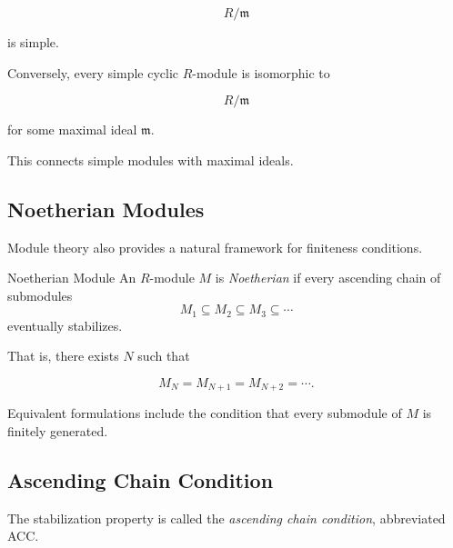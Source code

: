 \[ R/\mathfrak m \]

is simple.

Conversely, every simple cyclic \(R\)-module is isomorphic to

\[ R/\mathfrak m \]

for some maximal ideal \(\mathfrak m\).

This connects simple modules with maximal ideals.

\subsection{Noetherian Modules}
\label{subsec:noetherian-modules}

Module theory also provides a natural framework for finiteness conditions.

\begin{definitionbox}{Noetherian Module}
An \(R\)-module \(M\) is \emph{Noetherian} if every ascending chain of
submodules
\[ M_1\subseteq M_2\subseteq M_3\subseteq\cdots \]
eventually stabilizes.
\end{definitionbox}

That is, there exists \(N\) such that

\[ M_N=M_{N+1}=M_{N+2}=\cdots. \]

Equivalent formulations include the condition that every submodule of \(M\)
is finitely generated.

\subsection{Ascending Chain Condition}
\label{subsec:ascending-chain-condition-modules}

The stabilization property is called the \emph{ascending chain condition},
abbreviated ACC.

\begin{center}
\end{center}

